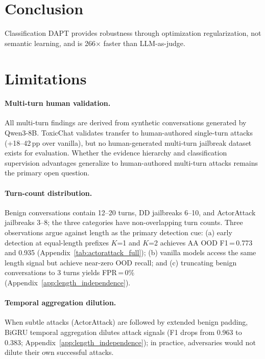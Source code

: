 \section{Conclusion}

Classification DAPT provides robustness through optimization regularization, not semantic learning, and is 266$\times$ faster than LLM-as-judge.

\section*{Limitations}
\label{sec:limitations}

\paragraph{Multi-turn human validation.}
All multi-turn findings are derived from synthetic conversations generated by Qwen3-8B. ToxicChat validates transfer to human-authored single-turn attacks (+18--42\,pp over vanilla), but no human-generated multi-turn jailbreak dataset exists for evaluation. Whether the evidence hierarchy and classification supervision advantages generalize to human-authored multi-turn attacks remains the primary open question.

\paragraph{Turn-count distribution.}
Benign conversations contain 12--20 turns, DD jailbreaks 6--10, and ActorAttack jailbreaks 3--8; the three categories have non-overlapping turn counts. Three observations argue against length as the primary detection cue: (a) early detection at equal-length prefixes $K$=1 and $K$=2 achieves AA OOD F1\,=\,0.773 and 0.935 (Appendix~\ref{tab:actorattack_full}); (b) vanilla models access the same length signal but achieve near-zero OOD recall; and (c) truncating benign conversations to 3 turns yields FPR\,=\,0\% (Appendix~\ref{app:length_independence}).

\paragraph{Temporal aggregation dilution.}
When subtle attacks (ActorAttack) are followed by extended benign padding, BiGRU temporal aggregation dilutes attack signals (F1 drops from 0.963 to 0.383; Appendix~\ref{app:length_independence}); in practice, adversaries would not dilute their own successful attacks.

